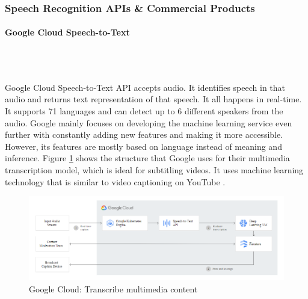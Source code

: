 \documentclass{article}
\newcommand{\subsubsubsection}[1]{\paragraph{#1}\mbox{}\\}
\begin{document}
\subsubsection{Speech Recognition APIs \& Commercial Products}
\subsubsubsection{Google Cloud Speech-to-Text}
{\large
\\Google Cloud Speech-to-Text API accepts audio. It identifies speech in that audio and returns text representation of that speech. It all happens in real-time. It supports 71 languages and can detect up to 6 different speakers from the audio. Google mainly focuses on developing the machine learning service even further with constantly adding new features and making it more accessible. However, its features are mostly based on language instead of meaning and inference. Figure \ref{fig:googlestructure} shows the structure that Google uses for their multimedia transcription model, which is ideal for subtitling videos. It uses machine learning technology that is similar to video captioning on YouTube \parencite{googledocs}.\par
}

\begin{figure}[H]
  \centering
  \includegraphics[scale=0.61]{img/googlestructure.png}
  \caption{Google Cloud: Transcribe multimedia content}
  \label{fig:googlestructure}
\end{figure}

\newpage
\end{document}
